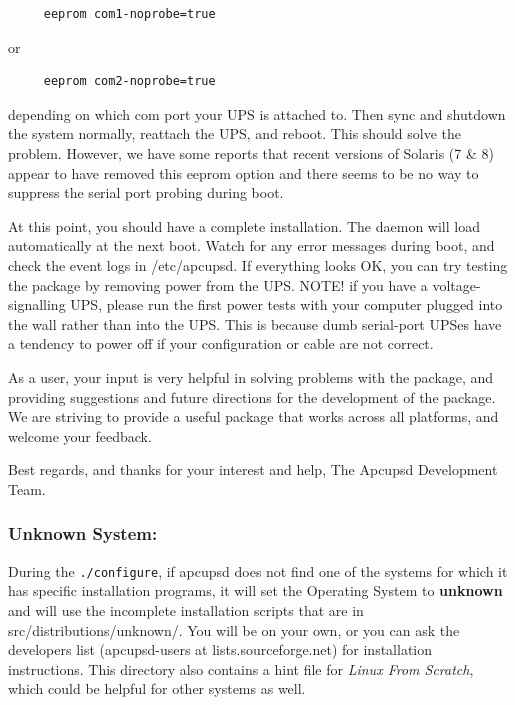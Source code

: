 \footnotesize
\begin{verbatim}
     eeprom com1-noprobe=true
\end{verbatim}
\normalsize

or 

\footnotesize
\begin{verbatim}
     eeprom com2-noprobe=true
\end{verbatim}
\normalsize

depending on which com port your UPS is attached to. Then sync and shutdown
the system normally, reattach the UPS, and reboot. This should solve the
problem. However, we have some reports that recent versions of Solaris (7 \&
8) appear to have removed this eeprom option and there seems to be no way to
suppress the serial port probing during boot.  

At this point, you should have a complete installation. The daemon will load
automatically at the next boot. Watch for any error messages during boot, and
check the event logs in /etc/apcupsd. If everything looks OK, you can try
testing the package by removing power from the UPS. NOTE! if you have a
voltage-signalling UPS, please run the first power tests with your computer
plugged into the wall rather than into the UPS. This is because dumb
serial-port UPSes have a tendency to power off if your configuration or cable
are not correct.  

As a user, your input is very helpful in solving problems with the package,
and providing suggestions and future directions for the development of the
package. We are striving to provide a useful package that works across all
platforms, and welcome your feedback.  

Best regards, and thanks for your interest and help, The Apcupsd Development
Team. 

\label{Unknown-System}

\subsubsection*{Unknown System:}

\label{index-Unknown-System-53}
\label{index-OS_002c-Unknown-System-54}
During the {\tt ./configure}, if apcupsd does not find one of the systems for
which it has specific installation programs, it will set the Operating System
to {\bf unknown} and will use the incomplete installation scripts that are in
\lt{}src\gt{}/distributions/unknown/. You will be on your own, or you can ask
the developers list (apcupsd-users at lists.sourceforge.net) for installation
instructions. This directory also contains a hint file for {\it Linux From
Scratch}, which could be helpful for other systems as well. 

